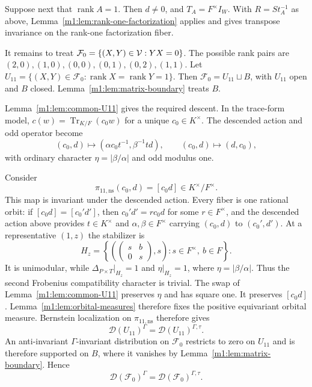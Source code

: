 Suppose next that $\operatorname{rank}A=1$.  Then $d\neq0$, and
$T_A=F^\times I_W$. With $R=S t_A^{-1}$ as above, Lemma~\ref{m1:lem:rank-one-factorization} applies and gives
transpose invariance on the rank-one factorization fiber.

It remains to treat \(\mathcal F_0=\{(X,Y)\in \mathcal V:YX=0\}\). The possible rank pairs are
\((2,0),\allowbreak(1,0),\allowbreak(0,0),\allowbreak(0,1),\allowbreak(0,2),\allowbreak(1,1)\). Let
\(U_{11}=\{(X,Y)\in\mathcal F_0: \operatorname{rank}X=\operatorname{rank}Y=1\}\). Then \(\mathcal
F_0=U_{11}\sqcup B\), with $U_{11}$ open and $B$ closed.  Lemma~\ref{m1:lem:matrix-boundary} treats
$B$.

Lemma~\ref{m1:lem:common-U11} gives the required descent. In the
trace-form model, $c(w)=\operatorname{Tr}_{K/F}(c_0w)$ for a unique
$c_0\in K^\times$.
The descended action and odd operator become
\[
 (c_0,d)\longmapsto(\alpha c_0t^{-1},\beta^{-1}td),\qquad
 (c_0,d)\longmapsto(d,c_0),
\]
with ordinary character $\eta=|\beta/\alpha|$ and odd modulus one.

Consider
\[
    \pi_{11,\mathrm{ns}}(c_0,d)=[c_0d]
    \in K^\times/F^\times.
\]
This map is invariant under the descended action.  Every fiber is one
rational orbit: if $[c_0d]=[c_0'd']$, then
$c_0'd'=r c_0d$ for some $r\in F^\times$, and the descended action above provides
$t\in K^\times$ and $\alpha,\beta\in F^\times$ carrying $(c_0,d)$ to
$(c_0',d')$.  At a representative $(1,z)$ the stabilizer is
\[
    H_z=
    \left\{
    \left(
        \begin{pmatrix}s&b\\0&s\end{pmatrix},s
    \right):
    s\in F^\times,\ b\in F
    \right\}.
\]
It is unimodular, while $\Delta_{P\times T}|_{H_z}=1$ and
$\eta|_{H_z}=1$, where $\eta=|\beta/\alpha|$. Thus the second Frobenius
compatibility character is trivial. The swap of
Lemma~\ref{m1:lem:common-U11} preserves $\eta$ and has square one.
It preserves $[c_0d]$. Lemma~\ref{m1:lem:orbital-measures} therefore fixes the positive
equivariant orbital measure.  Bernstein localization on $\pi_{11,\mathrm{ns}}$ therefore gives
\[
    \mathcal D(U_{11})^\Gamma=\mathcal D(U_{11})^{\Gamma,\tau}.
\]
An anti-invariant $\Gamma$-invariant distribution on $\mathcal F_0$ restricts to
zero on $U_{11}$ and is therefore supported on $B$, where it vanishes by
Lemma~\ref{m1:lem:matrix-boundary}.  Hence
\begin{equation}\label{m1:eq:nonsplit-zero-fiber}
    \mathcal D(\mathcal F_0)^\Gamma
    =
    \mathcal D(\mathcal F_0)^{\Gamma,\tau}.
\end{equation}

